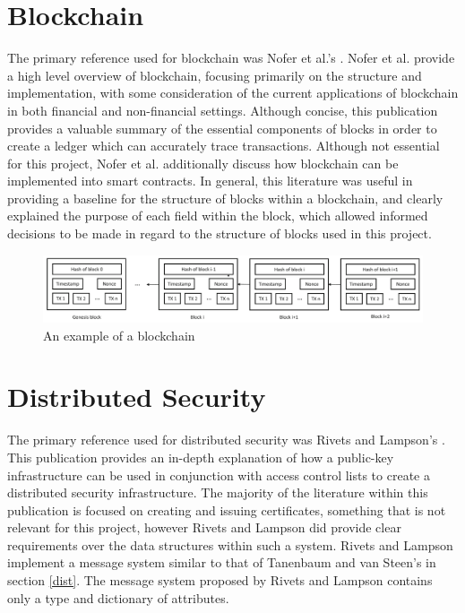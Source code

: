 \documentclass[a4paper, 11pt]{report}
\begin{document}
\section{Blockchain}
The primary reference used for \gls{blockchain} was Nofer et al.'s \cite{blockchain}. Nofer et al. provide a high level overview of \gls{blockchain}, focusing primarily on the structure and implementation, with some consideration of the current applications of \gls{blockchain} in both financial and non-financial settings. Although concise, this publication provides a valuable summary of the essential components of blocks in order to create a ledger which can accurately trace transactions. Although not essential for this project, Nofer et al. additionally discuss how \gls{blockchain} can be implemented into smart contracts. In general, this literature was useful in providing a baseline for the structure of blocks within a \gls{blockchain}, and clearly explained the purpose of each field within the block, which allowed informed decisions to be made in regard to the structure of blocks used in this project. 

\begin{center}
	\begin{figure}[H]
		\includegraphics[width=\textwidth,keepaspectratio]{NoferBlock}
		\caption{An example of a \gls{blockchain} \cite{blockchain}} 
		\label{fig:blockchain2}
	\end{figure}
\end{center}

\section{Distributed Security}
The primary reference used for distributed security was Rivets and Lampson's  \cite{sdsi}. This publication provides an in-depth explanation of how a public-key infrastructure can be used in conjunction with access control lists to create a distributed security infrastructure. The majority of the literature within this publication is focused on creating and issuing certificates, something that is not relevant for this project, however Rivets and Lampson did provide clear requirements over the data structures within such a system. Rivets and Lampson implement a message system similar to that of Tanenbaum and van Steen's in section \ref{dist}. The message system proposed by Rivets and Lampson contains only a type and dictionary of attributes.
\end{document}
